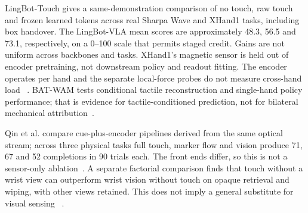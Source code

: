 LingBot-Touch gives a same-demonstration comparison of no touch, raw touch and
frozen learned tokens across real Sharpa Wave and XHand1 tasks, including box
handover. The LingBot-VLA mean scores are approximately 48.3, 56.5 and 73.1,
respectively, on a 0--100 scale that permits staged credit. Gains are not uniform
across backbones and tasks. XHand1's magnetic sensor is held out of encoder
pretraining, not downstream policy and readout fitting. The encoder operates
per hand and the separate local-force probes do not measure cross-hand load
~\cite{nov18lingbottouch}. BAT-WAM tests conditional tactile reconstruction and
single-hand policy performance; that is evidence for tactile-conditioned
prediction, not for bilateral mechanical attribution~\cite{nov18batwam}.

Qin et al. compare cue-plus-encoder pipelines derived from the same optical
stream; across three physical tasks full touch, marker flow and vision produce
71, 67 and 52 completions in 90 trials each. The front ends differ, so this is
not a sensor-only ablation~\cite{nov18physicaltactilecues}. A separate factorial
comparison finds that touch without a wrist view can outperform wrist vision
without touch on opaque retrieval and wiping, with other views retained.
This does not imply a general substitute for visual sensing
~\cite{nov18touchvswristvision}.
